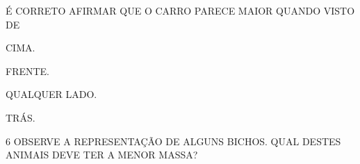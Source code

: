 É CORRETO AFIRMAR QUE O CARRO PARECE MAIOR QUANDO VISTO DE

\begin{multicols}{2}
\begin{escolha}
\item CIMA.

\item FRENTE.

\item QUALQUER LADO.

\item TRÁS.
\end{escolha}
\end{multicols}


\num{6} OBSERVE A REPRESENTAÇÃO DE ALGUNS BICHOS.
QUAL DESTES ANIMAIS DEVE TER A MENOR MASSA?


